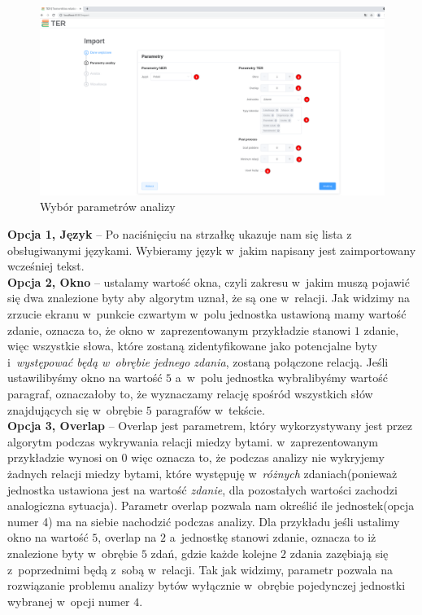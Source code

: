 \documentclass[12pt, a4paper]{article}
\begin{document}
\begin{figure}[H]
  \centering
  \includegraphics[width=\linewidth]{images/parameters.png}
  \caption{Wybór parametrów analizy}
\end{figure}

\noindent\textbf{Opcja 1, Język} -- Po naciśnięciu na strzałkę ukazuje nam się lista z~ obsługiwanymi językami. Wybieramy język w~jakim napisany jest zaimportowany wcześniej tekst.\\

\noindent\textbf{Opcja 2, Okno} -- ustalamy wartość okna, czyli zakresu w~jakim muszą pojawić się dwa znalezione byty aby algorytm uznał, że są one w~relacji. Jak widzimy na zrzucie ekranu w~punkcie czwartym w~polu jednostka ustawioną mamy wartość zdanie, oznacza to, że okno w~zaprezentowanym przykładzie stanowi $1$ zdanie, więc wszystkie słowa, które zostaną zidentyfikowane jako potencjalne byty i~\textit{występować będą w~obrębie jednego zdania}, zostaną połączone relacją. Jeśli ustawilibyśmy okno na wartość $5$ a~w~polu jednostka wybralibyśmy wartość paragraf, oznaczałoby to, że wyznaczamy relację spośród wszystkich słów znajdujących się w~obrębie $5$ paragrafów w~tekście.\\

\noindent\textbf{Opcja 3, Overlap} -- Overlap jest parametrem, który wykorzystywany jest przez algorytm podczas wykrywania relacji miedzy bytami. w~zaprezentowanym przykładzie wynosi on $0$ więc oznacza to, że podczas analizy nie wykryjemy żadnych relacji miedzy bytami, które występuję w~\textit{różnych} zdaniach(ponieważ jednostka ustawiona jest na wartość \textit{zdanie}, dla pozostałych wartości zachodzi analogiczna sytuacja). Parametr overlap pozwala nam określić ile jednostek(opcja numer 4) ma na siebie nachodzić podczas analizy. Dla przykładu jeśli ustalimy okno na wartość $5$, overlap na $2$ a~jednostkę stanowi zdanie, oznacza to iż znalezione byty w~obrębie $5$ zdań, gdzie każde kolejne $2$ zdania zazębiają się z~poprzednimi będą z~sobą w~relacji. Tak jak widzimy, parametr pozwala na rozwiązanie problemu analizy bytów wyłącznie w~obrębie pojedynczej jednostki wybranej w~opcji numer $4$.
\end{document}
